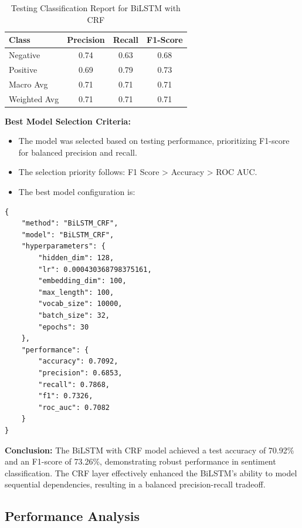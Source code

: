 \begin{table}[H]
    \centering
    \caption{Testing Classification Report for BiLSTM with CRF}
    \label{tab:bilstm-crf-classification-report}
    \begin{tabular}{|l|c|c|c|}
        \hline
        \textbf{Class} & \textbf{Precision} & \textbf{Recall} & \textbf{F1-Score} \\ 
        \hline
        Negative & 0.74 & 0.63 & 0.68 \\ 
        \hline
        Positive & 0.69 & 0.79 & 0.73 \\ 
        \hline
        Macro Avg & 0.71 & 0.71 & 0.71 \\ 
        \hline
        Weighted Avg & 0.71 & 0.71 & 0.71 \\ 
        \hline
    \end{tabular}
\end{table}

\textbf{Best Model Selection Criteria:}

\begin{itemize}
    \item The model was selected based on testing performance, prioritizing F1-score for balanced precision and recall.
    \item The selection priority follows: F1 Score > Accuracy > ROC AUC.
    \item The best model configuration is:
\end{itemize}

\begin{verbatim}
{
    "method": "BiLSTM_CRF",
    "model": "BiLSTM_CRF",
    "hyperparameters": {
        "hidden_dim": 128,
        "lr": 0.000430368798375161,
        "embedding_dim": 100,
        "max_length": 100,
        "vocab_size": 10000,
        "batch_size": 32,
        "epochs": 30
    },
    "performance": {
        "accuracy": 0.7092,
        "precision": 0.6853,
        "recall": 0.7868,
        "f1": 0.7326,
        "roc_auc": 0.7082
    }
}
\end{verbatim}

\textbf{Conclusion:} The BiLSTM with CRF model achieved a test accuracy of 70.92\% and an F1-score of 73.26\%, demonstrating robust performance in sentiment classification. The CRF layer effectively enhanced the BiLSTM’s ability to model sequential dependencies, resulting in a balanced precision-recall tradeoff.

\subsection{Performance Analysis}

